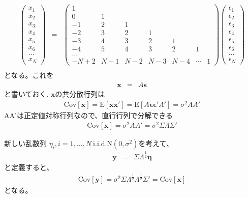 \documentclass{jsarticle}
\newcommand{\normal}{\mathrm{N}}
\newcommand{\ampeq}{&=&}
\newcommand{\cov}{\mathrm{Cov}}
\newcommand{\E}{\mathrm{E}}
\begin{document}
\begin{eqnarray*}
 \left(
  \begin{matrix}
   x_1 \\
   x_2 \\
   x_3 \\
   x_4 \\
   x_5 \\
   x_6 \\
   \dots \\
   x_N
  \end{matrix}
 \right)
 \ampeq
 \left(
  \begin{matrix}
   1 \\
   0 & 1 \\
   -1 & 2 & 1 \\
   -2 & 3 & 2 & 1 \\
   -3 & 4 & 3 & 2 & 1 \\
   -4 & 5 & 4 & 3 & 2 & 1 \\
   \dots \\
   -N+2 & N - 1 & N - 2 & N - 3 & N - 4 & \cdots & 1
  \end{matrix}
 \right)
 \left(
  \begin{matrix}
   \epsilon_1 \\
   \epsilon_2 \\
   \epsilon_3 \\
   \epsilon_4 \\
   \epsilon_5 \\
   \epsilon_6 \\
   \dots \\
   \epsilon_N
  \end{matrix}
 \right) \\
\end{eqnarray*}
となる。これを
\begin{eqnarray*}
 \bm{x} \ampeq A \bm{\epsilon}
\end{eqnarray*}
と書いておく. $\bm{x}$の共分散行列は
\begin{eqnarray*}
 \cov[\bm{x}] = \E[\bm{x}\bm{x}'] = \E[A\bm{\epsilon}\bm{\epsilon}'A'] = \sigma^2 AA'
\end{eqnarray*}
AA'は正定値対称行列なので、直行行列で分解できる
\begin{eqnarray*}
 \cov[\bm{x}] = \sigma^2 AA'= \sigma^2 \Sigma \Lambda \Sigma'
\end{eqnarray*}

新しい乱数列 $\eta_i, i = 1, \ldots, N ~ \mathrm{i.i.d.} \normal(0, \sigma^2)$を考えて、
\begin{eqnarray*}
 \bm{y} \ampeq \Sigma \Lambda^{\frac{1}{2}} \bm{\eta}
\end{eqnarray*}
と定義すると、
\begin{eqnarray*}
 \cov[\bm{y}] = \sigma^2 \Sigma \Lambda^{\frac{1}{2}} \Lambda^{\frac{1}{2}} \Sigma' = \cov[\bm{x}]
\end{eqnarray*}
となる。
\end{document}
